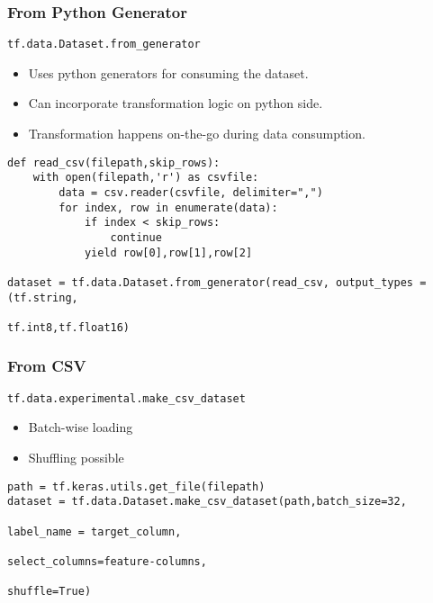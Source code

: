 
\begin{frame}[fragile]\frametitle{From Python Generator}
\lstinline|tf.data.Dataset.from_generator|

\begin{itemize}
\item Uses python generators for consuming the dataset.
\item Can incorporate transformation logic on python side.
\item Transformation happens on-the-go during data consumption.
\end{itemize}

\begin{lstlisting}
def read_csv(filepath,skip_rows):
	with open(filepath,'r') as csvfile:
		data = csv.reader(csvfile, delimiter=",")
		for index, row in enumerate(data):
			if index < skip_rows:
				continue
			yield row[0],row[1],row[2]
			
dataset = tf.data.Dataset.from_generator(read_csv, output_types =(tf.string,
																					tf.int8,tf.float16)
\end{lstlisting}
\end{frame}

\begin{frame}[fragile]\frametitle{From CSV}
\lstinline|tf.data.experimental.make_csv_dataset|

\begin{itemize}
\item Batch-wise loading
\item Shuffling possible
\end{itemize}

\begin{lstlisting}
path = tf.keras.utils.get_file(filepath)
dataset = tf.data.Dataset.make_csv_dataset(path,batch_size=32,
																						label_name = target_column,
																						select_columns=feature-columns,
																						shuffle=True)
\end{lstlisting}
\end{frame}

